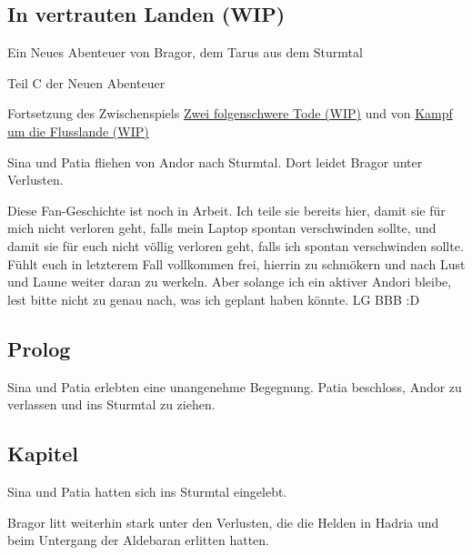 \begin{chapterbox}
    \chapter{In vertrauten Landen (WIP)}
    \label{wip-in-vertrauten-landen}
    
    \begin{center}
        Ein Neues Abenteuer von Bragor, dem Tarus aus dem Sturmtal

        Teil C der Neuen Abenteuer

        Fortsetzung des Zwischenspiels \hyperref[wip-zwei-folgenschwere-tode]{Zwei folgenschwere Tode (WIP)} und von \hyperref[wip-kampf-um-die-flusslande]{Kampf um die Flusslande (WIP)}
    \end{center}

    Sina und Patia fliehen von Andor nach Sturmtal. Dort leidet Bragor unter Verlusten.
\end{chapterbox}




Diese Fan-Geschichte ist noch in Arbeit. Ich teile sie bereits hier, damit sie für mich nicht verloren geht, falls mein Laptop spontan verschwinden sollte, und damit sie für euch nicht völlig verloren geht, falls ich spontan verschwinden sollte. Fühlt euch in letzterem Fall vollkommen frei, hierrin zu schmökern und nach Lust und Laune weiter daran zu werkeln. Aber solange ich ein aktiver Andori bleibe, lest bitte nicht zu genau nach, was ich geplant haben könnte. LG BBB :D



\newpage
\section{Prolog}

Sina und Patia erlebten eine unangenehme Begegnung. Patia beschloss, Andor zu verlassen und ins Sturmtal zu ziehen.





\newpage
\section{Kapitel}

Sina und Patia hatten sich ins Sturmtal eingelebt. 

Bragor litt weiterhin stark unter den Verlusten, die die Helden in Hadria und beim Untergang der Aldebaran erlitten hatten.

